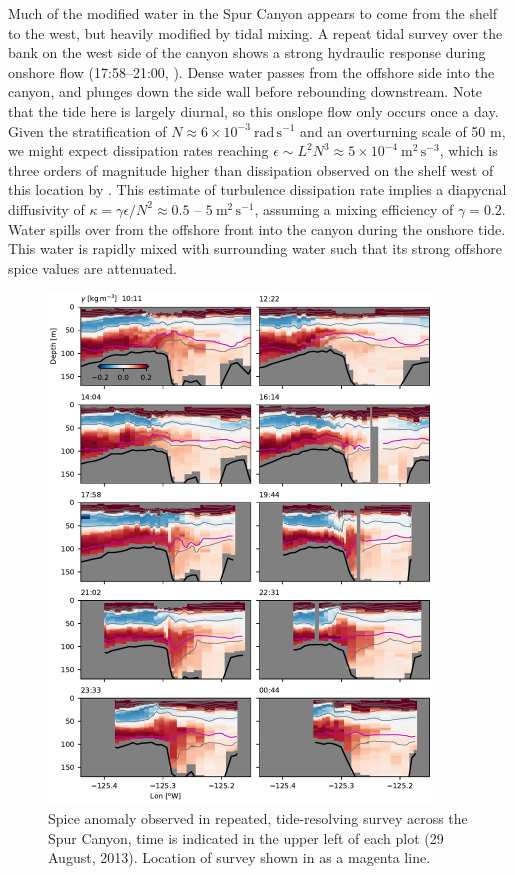 \documentclass[draft]{agujournal2019}
\begin{document}
Much of the modified water in the Spur Canyon appears to come from the shelf to the west, but heavily modified by tidal mixing. A repeat tidal survey over the bank on the west side of the canyon shows a strong hydraulic response during onshore flow (17:58--21:00, ).  Dense water passes from the offshore side into the canyon, and plunges down the side wall before rebounding downstream.  Note that the tide here is largely diurnal, so this onslope flow only occurs once a day.  Given the stratification of $N\approx 6\times10^{-3} \ \mathrm{rad\,s^{-1}}$ and an overturning scale of 50 m, we might expect dissipation rates reaching $\epsilon \sim L^2N^{3} \approx 5\times10^{-4}\ \mathrm{m^2\,s^{-3}}$, which is three orders of magnitude higher than dissipation observed on the shelf west of this location by .  This estimate of turbulence dissipation rate implies a diapycnal diffusivity of $\kappa = \gamma \epsilon / N^2 \approx 0.5$ -- $5\ \mathrm{m^2\,s^{-1}}$, assuming a mixing efficiency of $\gamma=0.2$. Water spills over from the offshore front into the canyon during the onshore tide.  This water is rapidly mixed with surrounding water such that its strong offshore spice values are attenuated.

\begin{figure}[htbp]
  \begin{center}
    \includegraphics[width=4in]{HydraulicsCanyon}
    \caption{Spice anomaly observed in repeated, tide-resolving survey across the Spur Canyon, time is indicated in the upper left of each plot (29 August, 2013).   Location of survey shown in  as a magenta line.
      \label{fig:HydraulicsCanyon}
    }
  \end{center}
\end{figure}
\end{document}

